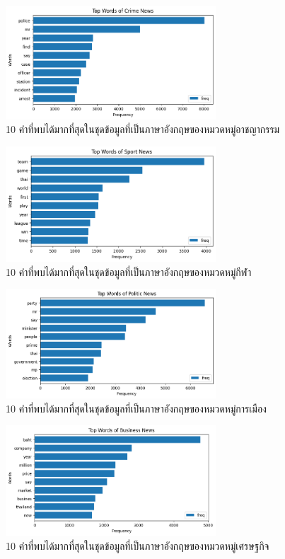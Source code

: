 \documentclass[12pt,oneside,openright,a4paper]{cpe-thai-project}
\begin{document}
        \begin{figure}[!ht]\centering
          \includegraphics[width=0.7\textwidth]{./img/eng_stat/crime_bar.png}
          \caption{10 คำที่พบได้มากที่สุดในชุดข้อมูลที่เป็นภาษาอังกฤษของหมวดหมู่อาชญากรรม}\label{fig:crime_bar_eng}
        \end{figure}
        \newpage
        \begin{figure}[!ht]\centering
          \includegraphics[width=0.7\textwidth]{./img/eng_stat/sport_bar.png}
          \caption{10 คำที่พบได้มากที่สุดในชุดข้อมูลที่เป็นภาษาอังกฤษของหมวดหมู่กีฬา}\label{fig:sport_bar_eng}
        \end{figure}
        \begin{figure}[!ht]\centering
          \includegraphics[width=0.7\textwidth]{./img/eng_stat/polit_bar.png}
          \caption{10 คำที่พบได้มากที่สุดในชุดข้อมูลที่เป็นภาษาอังกฤษของหมวดหมู่การเมือง}\label{fig:polit_bar_eng}
        \end{figure}
        \begin{figure}[!ht]\centering
          \includegraphics[width=0.7\textwidth]{./img/eng_stat/bus_bar.png}
          \caption{10 คำที่พบได้มากที่สุดในชุดข้อมูลที่เป็นภาษาอังกฤษของหมวดหมู่เศรษฐกิจ}\label{fig:bus_bar_eng}
        \end{figure}
\end{document}

